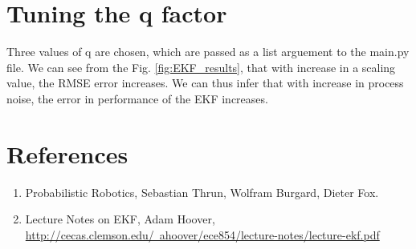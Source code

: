 \documentclass[12pt]{article}
\begin{document}
\section{Tuning the q factor}
Three values of q are chosen, which are passed as a list arguement to the main.py file. We can see from the Fig. \ref{fig:EKF_results}, that with increase in a scaling value, the RMSE error increases. We can thus infer that with increase in process noise, the error in performance of the EKF increases.


\section{References}
\begin{enumerate}
  \item Probabilistic Robotics, Sebastian Thrun, Wolfram Burgard, Dieter Fox.
  \item Lecture Notes on EKF, Adam Hoover,
\href{http://cecas.clemson.edu/~ahoover/ece854/lecture-notes/lecture-ekf.pdf}{\color{blue}http://cecas.clemson.edu/~ahoover/ece854/lecture-notes/lecture-ekf.pdf}  
\end{enumerate}
\end{document}
